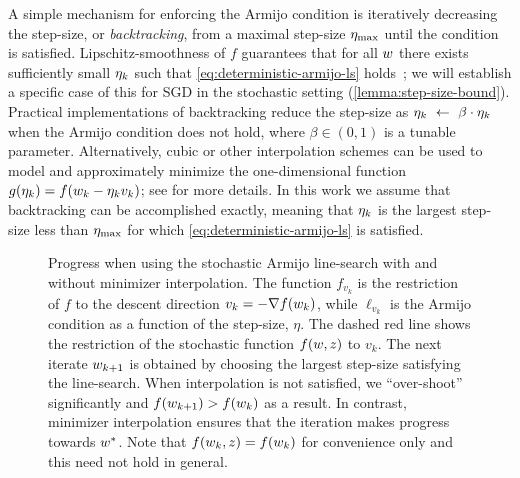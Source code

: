 A simple mechanism for enforcing the Armijo condition is iteratively decreasing the step-size, or \emph{backtracking}, from a maximal step-size \( \eta_{\text{max}} \) until the condition is satisfied.
Lipschitz-smoothness of \( f \) guarantees that for all \( w \) there exists sufficiently small \( \eta_k \) such that \autoref{eq:deterministic-armijo-ls} holds~\citep{nocedal1999numerical}; we will establish a specific case of this for \ac{SGD} in the stochastic setting (\autoref{lemma:step-size-bound}). 
Practical implementations of backtracking reduce the step-size as \( \eta_k~\gets~\beta \cdot \eta_k \) when the Armijo condition does not hold, where \( \beta \in (0,1) \) is a tunable parameter. 
Alternatively, cubic or other interpolation schemes can be used to model and approximately minimize the one-dimensional function \( g(\eta_k) = f(w_k - \eta_k v_k) \); see \citet{nocedal1999numerical} for more details.
In this work we assume that backtracking can be accomplished exactly, meaning that \( \eta_k \) is the largest step-size less than \( \eta_{\text{max}} \) for which \autoref{eq:deterministic-armijo-ls} is satisfied.

\begin{figure}[t]
    \centering
    
    \caption{
        Progress when using the stochastic Armijo line-search with and without minimizer interpolation.
        The function \( f_{v_k} \) is the restriction of \( f \) to the descent direction \( v_k = -\nabla f(w_k) \), while \( \ell_{v_k} \) is the Armijo condition as a function of the step-size, \( \eta \).
        The dashed red line shows the restriction of the stochastic function \( f(w, z) \) to \( v_k \).
        The next iterate \( w_{k+1} \) is obtained by choosing the largest step-size satisfying the line-search. 
        When interpolation is not satisfied, we ``over-shoot'' significantly and \( f(w_{k+1}) > f(w_k) \) as a result.
        In contrast, minimizer interpolation ensures that the iteration makes progress towards \( w^* \). 
        Note that \( f(w_k,z) = f(w_k) \) for convenience only and this need not hold in general. 
    }%
    \label{fig:interpolation-ls}
\end{figure}

